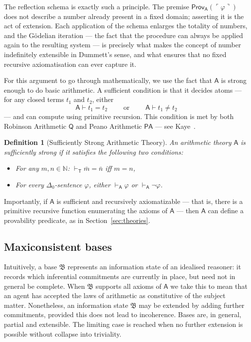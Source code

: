 \documentclass[reqno]{asl}
\newtheorem{definition}{Definition}
\newcommand{\proves}{\vdash}
\newcommand{\base}[1]{\mathfrak{#1}}
\renewcommand{\phi}{\varphi}
\newcommand{\pa}{\textsf{A}}
\newcommand{\Prov}{\textsf{Prov}}
\begin{document}
The reflection schema is exactly such a principle. The
premise $\Prov_{\pa}(\ulcorner \varphi \urcorner)$ does not describe a number
already present in a fixed domain; asserting it is the act of extension.
Each application of the schema enlarges the totality of numbers, and the
G\"{o}delian iteration --- the fact that the procedure can always be applied
again to the resulting system --- is precisely what makes the concept of
number indefinitely extensible in Dummett's sense, and what ensures that no
fixed recursive axiomatisation can ever capture it. 

For this argument to go through mathematically, we use the fact that $\pa$ is strong enough to do basic arithmetic. A sufficient condition is that it decides atoms --- for any closed terms $t_1$ and $t_2$, either
\[
\pa \proves t_1 = t_2 \qquad \text{ or } \qquad  \pa \proves t_1 \neq t_2
\]
--- and can compute using primitive recursion.  This condition is met by both Robinson Arithmetic $\mathsf{Q}$ and Peano Arithmetic $\mathsf{PA}$ --- see Kaye~\cite{Kaye1991}.

\begin{definition}[Sufficiently Strong Arithmetic Theory]
An arithmetic theory $\pa$ is \emph{sufficiently strong} if it satisfies the following two conditions:
\begin{itemize}
    \item For any $m, n \in \mathbb{N}$: $\vdash_{\mathsf{T}} \bar{m} = \bar{n}$ iff $m=n$,
    \item For every $\Delta_0$-sentence $\phi$, either $\vdash_{\pa} \phi$ or $\vdash_{\pa} \neg\phi$.
\end{itemize}
\end{definition}

Importantly, if $\pa$ is sufficient and recursively axiomatizable --- that is, 
there is a primitive recursive function enumerating the axioms of $\pa$ --- then 
$\pa$ can define a provability predicate, as in Section~\ref{sec:theories}.

\subsection*{Maxiconsistent bases}

Intuitively, a base $\base{B}$ represents an information state of an 
idealised reasoner: it records which inferential commitments are 
currently in place, but need not in general be complete. When $\base{B}$ 
supports all axioms of $\pa$ we take this to mean that an agent has 
accepted the laws of arithmetic as constitutive of the subject matter. Nonetheless, an information state $\base{B}$ may be extended by adding 
further commitments, provided this does not lead to incoherence. Bases 
are, in general, partial and extensible. The limiting case is reached 
when no further extension is possible without collapse into triviality. 
\end{document}
